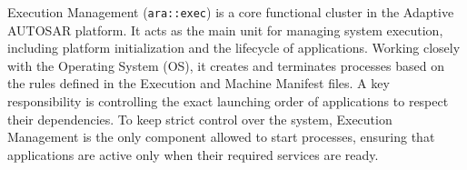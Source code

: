 


Execution Management (\texttt{ara::exec}) is a core functional cluster in the Adaptive AUTOSAR platform. It acts as the main unit for managing system execution, including platform initialization and the lifecycle of applications. Working closely with the Operating System (OS), it creates and terminates processes based on the rules defined in the Execution and Machine Manifest files. A key responsibility is controlling the exact launching order of applications to respect their dependencies. To keep strict control over the system, Execution Management is the only component allowed to start processes, ensuring that applications are active only when their required services are ready.

